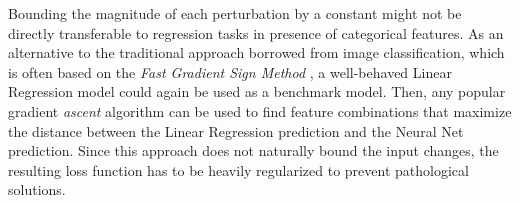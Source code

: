 Bounding the magnitude of each perturbation by a constant might not be directly transferable to regression tasks in presence of categorical features.
As an alternative to the traditional approach borrowed from image classification, which is often based on the \emph{Fast Gradient Sign Method} \citep{goodfellow2015}, a well-behaved Linear Regression model could again be used as a benchmark model.
Then, any popular gradient \emph{ascent} algorithm can be used to find feature combinations that maximize the distance between the Linear Regression prediction and the Neural Net prediction.
Since this approach does not naturally bound the input changes, the resulting loss function has to be heavily regularized to prevent pathological solutions.


